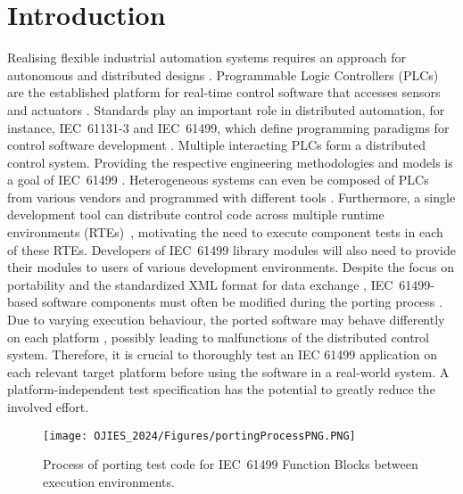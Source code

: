 \section{Introduction}
\label{sec:introduction}
Realising flexible industrial automation systems requires an approach
 for autonomous and distributed designs \cite{Lyu.2021}. Programmable Logic Controllers (PLCs) are the established platform for real-time control software that accesses sensors and actuators \cite{Sehr.2021}.  Standards play an important role in distributed automation, for instance, IEC~61131-3 and IEC~61499, which define programming paradigms for control software development \cite{Lyu.2021}. %
 Multiple interacting PLCs form a distributed control system. Providing the respective engineering methodologies and models is a goal of IEC~61499 \cite{61499}. Heterogeneous systems can even be composed of PLCs from various vendors and programmed with different tools \cite{lyu2020towards} \cite{mazzolini2017structured}. Furthermore, a single development tool can distribute control code across multiple runtime environments (RTEs)~\cite{eclipse4diac}, motivating the need to execute component tests in each of these RTEs. Developers of IEC~61499 library modules  \cite{oberlehner.2022} will also need to provide their modules to users of various development environments. 
 Despite the focus on portability \cite{61499} and the standardized XML format for data exchange \cite{61499.2}, IEC~61499-based software components must often be modified during the porting process \cite{Hopsu.2019, Testing_Midhun}. Due to varying execution behaviour, the ported software may behave differently on each platform \cite{Testing_Midhun, Wiesmayr.2023}, possibly leading to malfunctions of the distributed control system. Therefore, it is crucial to thoroughly test an IEC 61499 application on each relevant target platform before using the software in a real-world system. A platform-independent test specification has the potential to greatly reduce the involved effort.
\begin{figure*}[t]
    \centering
    \texttt{[image: OJIES\_2024/Figures/portingProcessPNG.PNG]}
    \caption{Process of porting test code for IEC~61499 Function Blocks between execution environments.}
    \label{fig:porting_process}
\end{figure*}


